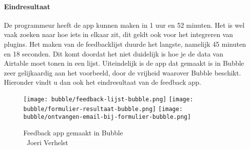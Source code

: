 \paragraph*{Eindresultaat}
De programmeur heeft de app kunnen maken in 1 uur en 52 minuten. Het is wel vaak zoeken naar hoe iets in elkaar zit, dit geldt ook voor het integreren van plugins.
Het maken van de feedbacklijst duurde het langste, namelijk 45 minuten en 18 seconden. Dit komt doordat het niet duidelijk is hoe je de data van Airtable moet tonen in een lijst.
Uiteindelijk is de app dat gemaakt is in Bubble zeer gelijkaardig aan het voorbeeld, door de vrijheid waarover Bubble beschikt. Hieronder vindt u dan ook het eindresultaat van de feedback app.
\\
\begin{figure}[H]
    \texttt{[image: bubble/feedback-lijst-bubble.png]}
    \texttt{[image: bubble/formulier-resultaat-bubble.png]}
    \texttt{[image: bubble/ontvangen-email-bij-formulier-bubble.png]}
    \caption[Feedback app gemaakt in Bubble]{Feedback app gemaakt in Bubble\\\textcopyright\ Joeri Verhelst}
    \label{fig:feedback-app-bubble}
\end{figure}

